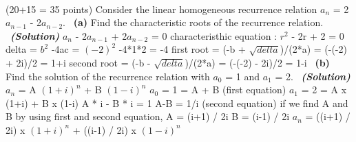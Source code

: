 \documentclass[a4 paper]{article}
\numberwithin{equation}{section}
\newcommand{\problem}[2]{~\\\fbox{\textbf{Problem #1}}\hfill (#2 points)\newline\newline}
\newcommand{\subproblem}[1]{~\newline\textbf{(#1)}}
\newcommand{\solution}{~\newline\textbf{\textit{(Solution)}} }
\newcommand{\0}{\mathbf{0}}
\begin{document}
\newpage
\problem{3}{20+15 = 35}
Consider the linear homogeneous recurrence relation $a_n$ = 2$a_{n-1}$ - 2$a_{n-2}$.
\subproblem{a} Find the characteristic roots of the recurrence relation.
\solution
\newline
\newline
$a_n$ - 2$a_{n-1}$ + 2$a_{n-2}$ = 0
\newline
characteristhic equation :
\newline
$r^2$ - 2r + 2 = 0
\newline
delta = $b^2$ -4ac = $(-2)^2$ -4*1*2 = -4
\newline
\newline
first root = (-b + $\sqrt{delta}$)/(2*a) = (-(-2) + 2i)/2 = 1+i
\newline
second root = (-b - $\sqrt{delta}$)/(2*a) = (-(-2) - 2i)/2 = 1-i
\newline
\subproblem{b} Find the solution of the recurrence relation with $a_0$ = 1 and $a_1$ = 2.
\solution
\newline
\newline
$a_n$ = A $(1+i)^n$ + B $(1-i)^n$
\newline
$a_0$ = 1 = A + B (first equation)
\newline
$a_1$ = 2 = A x (1+i) + B x (1-i)
\newline
A * i - B * i = 1
\newline
A-B = 1/i (second equation)
\newline
if we find A and B by using first and second equation,
\newline
A = (i+1) / 2i
\newline
B = (i-1) / 2i
\newline
\newline
$a_n$ = ((i+1) / 2i) x $(1+i)^n$ + ((i-1) / 2i) x $(1-i)^n$
\end{document}
